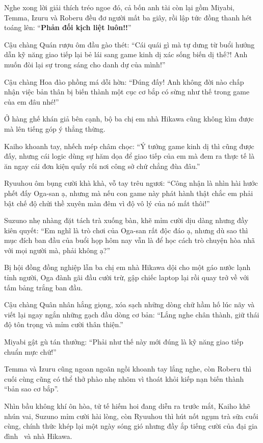 \documentclass[../main.tex]{subfiles}
\begin{document}
Nghe xong lời giải thích tréo ngoe đó, cả bốn anh tài còn lại gồm Miyabi, Temma, Izuru và Roberu đều đơ người mất ba giây, rồi lập tức đồng thanh hét toáng lên: ``\textbf{Phản đối kịch liệt luôn!!}''


Cậu chàng Quán rượu ôm đầu gào thét: ``Cái quái gì mà tự dưng từ buổi hướng dẫn kỹ năng giao tiếp lại bẻ lái sang game kinh dị xác sống biến dị thế?! Anh muốn đòi lại sự trong sáng cho danh dự của mình!''

Cậu chàng Hoa đào phồng má dỗi hờn: ``Đúng đấy! Anh không đời nào chấp nhận việc bản thân bị biến thành một cục cơ bắp có sừng như thế trong game của em đâu nhé!''

Ở hàng ghế khán giả bên cạnh, bộ ba chị em nhà Hikawa cũng không kìm được mà lên tiếng góp ý thẳng thừng.

Kaiho khoanh tay, nhếch mép châm chọc: ``Ý tưởng game kinh dị thì cũng được đấy, nhưng cái logic dùng sự hăm dọa để giao tiếp của em mà đem ra thực tế là ăn ngay cái đơn kiện quấy rối nơi công sở chứ chẳng đùa đâu.''

Ryuuhou ôm bụng cười khà khà, vỗ tay trêu ngươi: ``Công nhận là nhìn hài hước phết đấy Oga-san ạ, nhưng mà nếu con game này phát hành thật chắc em phải bật chế độ chửi thề xuyên màn đêm vì độ vô lý của nó mất thôi!''

Suzuno nhẹ nhàng đặt tách trà xuống bàn, khẽ mỉm cười dịu dàng nhưng đầy kiên quyết: ``Em nghĩ là trò chơi của Oga-san rất độc đáo ạ, nhưng dù sao thì mục đích ban đầu của buổi họp hôm nay vẫn là để học cách trò chuyện hòa nhã với mọi người mà, phải không ạ?''

Bị hội đồng đồng nghiệp lẫn ba chị em nhà Hikawa dội cho một gáo nước lạnh tỉnh người, Oga đành gãi đầu cười trừ, gập chiếc laptop lại rồi quay trở về với tấm bảng trắng ban đầu.

Cậu chàng Quân nhân hắng giọng, xóa sạch những dòng chữ hầm hố lúc nãy và viết lại ngay ngắn những gạch đầu dòng cơ bản: ``Lắng nghe chân thành, giữ thái độ tôn trọng và mỉm cười thân thiện.''

Miyabi gật gù tán thưởng: ``Phải như thế này mới đúng là kỹ năng giao tiếp chuẩn mực chứ!''

Temma và Izuru cũng ngoan ngoãn ngồi khoanh tay lắng nghe, còn Roberu thì cuối cùng cũng có thể thở phào nhẹ nhõm vì thoát khỏi kiếp nạn biến thành ``bản sao cơ bắp''.

Nhìn bầu không khí ôn hòa, tử tế hiếm hoi đang diễn ra trước mắt, Kaiho khẽ nhún vai, Suzuno mỉm cười hài lòng, còn Ryuuhou thì hút nốt ngụm trà sữa cuối cùng, chính thức khép lại một ngày sóng gió nhưng đầy ắp tiếng cười của đại gia đình \hls\ và nhà Hikawa.
\end{document}
